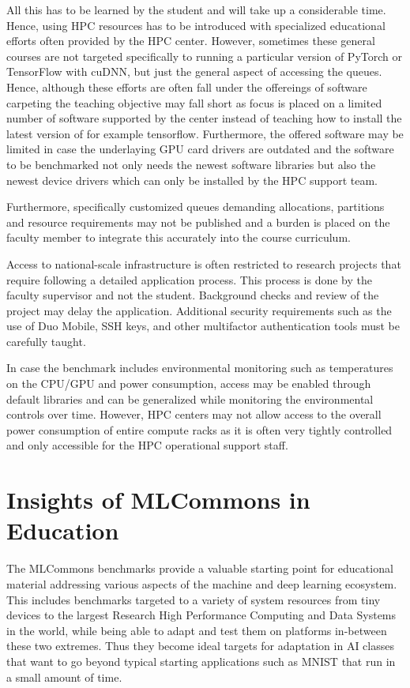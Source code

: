 \documentclass[utf8]{FrontiersinVancouver} %
\begin{document}
All this has to be learned by the student and will take up a
considerable time. Hence, using HPC resources has to be introduced
with specialized educational efforts often provided by the HPC
center. However, sometimes these general courses are not targeted
specifically to running a particular version of PyTorch or TensorFlow
with cuDNN, but just the general aspect of accessing the
queues. Hence, although these efforts are often fall under the
offereings of software carpeting the teaching objective may fall short
as focus is placed on a limited number of software supported by the
center instead of teaching how to install the latest version of for
example tensorflow. Furthermore, the offered software may be limited
in case the underlaying GPU card drivers are outdated and the software
to be benchmarked not only needs the newest software libraries but
also the newest device drivers which can only be installed by the HPC
support team.

Furthermore, specifically customized queues demanding allocations,
partitions and resource requirements may not be published and a burden
is placed on the faculty member to integrate this accurately into the
course curriculum.

Access to national-scale infrastructure is often restricted to
research projects that require following a detailed application
process. This process is done by the faculty supervisor and not the
student. Background checks and review of the project may delay the
application. Additional security requirements such as the use of Duo
Mobile, SSH keys, and other multifactor authentication tools must be
carefully taught.

In case the benchmark includes environmental monitoring such as
temperatures on the CPU/GPU and power consumption, access may be
enabled through default libraries and can be generalized while
monitoring the environmental controls over time. However, HPC centers
may not allow access to the overall power consumption of entire
compute racks as it is often very tightly controlled and only
accessible for the HPC operational support staff.

\section{Insights of MLCommons in Education}
\label{sec:edu-mlcommons-insights}

The MLCommons benchmarks provide a valuable starting point for
educational material addressing various aspects of the machine and
deep learning ecosystem. This includes benchmarks targeted to a
variety of system resources from tiny devices to the largest Research
High Performance Computing and Data Systems in the world, while being
able to adapt and test them on platforms in-between these two
extremes. Thus they become ideal targets for adaptation in AI classes
that want to go beyond typical starting applications such as MNIST
that run in a small amount of time.
\end{document}
